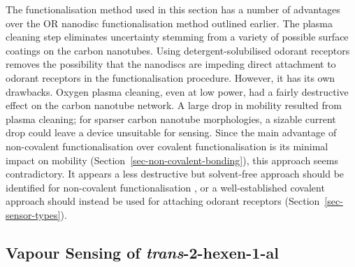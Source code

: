 \documentclass[
  a4paper,
]{scrbook}
\begin{document}
The functionalisation method used in this section has a number of
advantages over the OR nanodisc functionalisation method outlined
earlier. The plasma cleaning step eliminates uncertainty stemming from a
variety of possible surface coatings on the carbon nanotubes. Using
detergent-solubilised odorant receptors removes the possibility that the
nanodiscs are impeding direct attachment to odorant receptors in the
functionalisation procedure. However, it has its own drawbacks. Oxygen
plasma cleaning, even at low power, had a fairly destructive effect on
the carbon nanotube network. A large drop in mobility resulted from
plasma cleaning; for sparser carbon nanotube morphologies, a sizable
current drop could leave a device unsuitable for sensing. Since the main
advantage of non-covalent functionalisation over covalent
functionalisation is its minimal impact on mobility
(Section~\ref{sec-non-covalent-bonding}), this approach seems
contradictory. It appears a less destructive but solvent-free approach
should be identified for non-covalent functionalisation
\autocite{Ashraf2014}, or a well-established covalent approach should
instead be used for attaching odorant receptors
(Section~\ref{sec-sensor-types}).

\hypertarget{vapour-sensing-of-trans-2-hexen-1-al}{%
\subsection{\texorpdfstring{Vapour Sensing of
\emph{trans}-2-hexen-1-al}{Vapour Sensing of trans-2-hexen-1-al}}\label{vapour-sensing-of-trans-2-hexen-1-al}}
\end{document}
